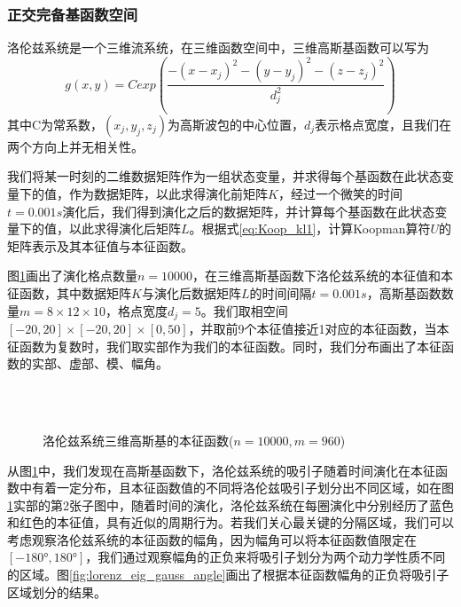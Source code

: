 \subsubsection{正交完备基函数空间}
洛伦兹系统是一个三维流系统，在三维函数空间中，三维高斯基函数可以写为
\begin{equation}
  g(x,y)=Cexp({\dfrac{-(x-x_j)^2-(y-y_j)^2-(z-z_j)^2}{d_j^2}})
\end{equation}
其中C为常系数，$(x_j,y_j,z_j)$为高斯波包的中心位置，$d_j$表示格点宽度，且我们在两个方向上并无相关性。

我们将某一时刻的二维数据矩阵作为一组状态变量，并求得每个基函数在此状态变量下的值，作为数据矩阵，以此求得演化前矩阵$K$，经过一个微笑的时间$t=0.001s$演化后，我们得到演化之后的数据矩阵，并计算每个基函数在此状态变量下的值，以此求得演化后矩阵$L$。根据式\eqref{eq:Koop_kl1}，计算Koopman算符$U$的矩阵表示及其本征值与本征函数。

图\ref{fig:lorenz_eig_gauss}画出了演化格点数量$n=10000$，在三维高斯基函数下洛伦兹系统的本征值和本征函数，其中数据矩阵$K$与演化后数据矩阵$L$的时间间隔$t=0.001s$，高斯基函数数量$m=8\times 12\times 10$，格点宽度$d_j=5$。我们取相空间$[-20,20]\times [-20,20]\times [0,50]$，并取前9个本征值接近1对应的本征函数，当本征函数为复数时，我们取实部作为我们的本征函数。同时，我们分布画出了本征函数的实部、虚部、模、幅角。
\begin{figure}
    \centering
    \\
    \\
    \caption{洛伦兹系统三维高斯基的本征函数($n=10000,m=960$)}\label{fig:lorenz_eig_gauss}
\end{figure}

从图\ref{fig:lorenz_eig_gauss}中，我们发现在高斯基函数下，洛伦兹系统的吸引子随着时间演化在本征函数中有着一定分布，且本征函数值的不同将洛伦兹吸引子划分出不同区域，如在图\ref{fig:lorenz_eig_gauss}实部的第2张子图中，随着时间的演化，洛伦兹系统在每圈演化中分别经历了蓝色和红色的本征值，具有近似的周期行为。若我们关心最关键的分隔区域，我们可以考虑观察洛伦兹系统的本征函数的幅角，因为幅角可以将本征函数值限定在$[-180°,180°]$，我们通过观察幅角的正负来将吸引子划分为两个动力学性质不同的区域。图\ref{fig:lorenz_eig_gauss_angle}画出了根据本征函数幅角的正负将吸引子区域划分的结果。

